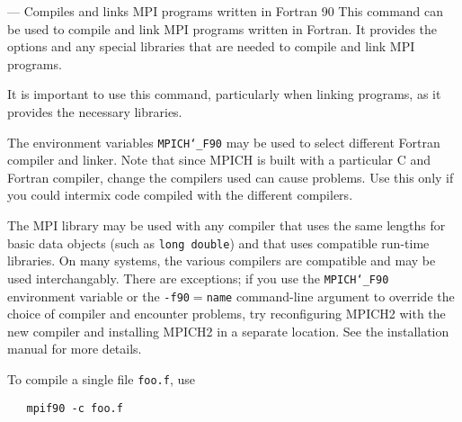 \startmanpage
{}
--- Compiles and links MPI programs written in Fortran 90 
This command can be used to compile and link MPI programs written in
Fortran.  It provides the options and any special libraries that are
needed to compile and link MPI programs.
\par
It is important to use this command, particularly when linking programs,
as it provides the necessary libraries.
\par
{}
\par
{}
The environment variables {\tt MPICH{\tt \char`\_}F90} may be used
to select different Fortran compiler and linker.  Note that since
MPICH is built with a particular C and Fortran compiler, change the
compilers used can cause problems.  Use this only if you could intermix
code compiled with the different compilers.
\par
{}
The MPI library may be used with any compiler that uses the same
lengths for basic data objects (such as {\tt long double}) and that
uses compatible run-time libraries.  On many systems, the various
compilers are compatible and may be used interchangably.  There are
exceptions; if you use the {\tt MPICH{\tt \char`\_}F90} environment variable or the
{\tt -f90$=$name} command-line argument to override the choice of compiler
and encounter problems, try reconfiguring MPICH2 with the new compiler
and installing MPICH2 in a separate location.  See the installation manual
for more details.
\par
{}
To compile a single file {\tt foo.f}, use
\begin{verbatim}
   mpif90 -c foo.f 
\end{verbatim}

